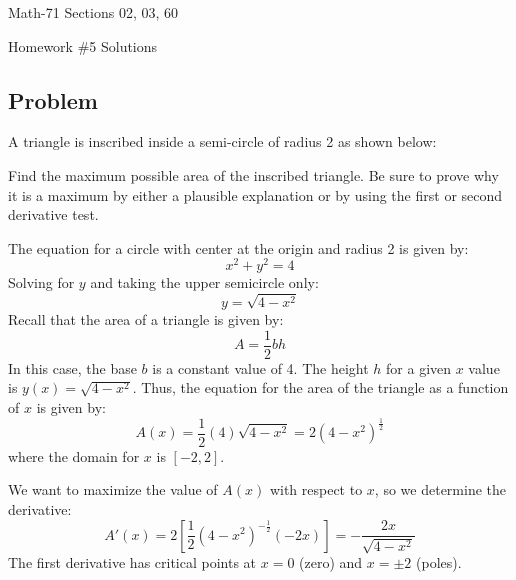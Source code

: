 \documentclass[letterpaper,12pt,fleqn]{article}
\begin{document}
\begin{center}
  \large
  Math-71 Sections 02, 03, 60

  \Large
  Homework \#5 Solutions
\end{center}

\subsection*{Problem}

A triangle is inscribed inside a semi-circle of radius 2 as shown below:

\bigskip

\begin{center}
\end{center}

\bigskip

Find the maximum possible area of the inscribed triangle.  Be sure to prove why it is a maximum by either a plausible
explanation or by using the first or second derivative test.

The equation for a circle with center at the origin and radius 2 is given by:
\[x^2+y^2=4\]
Solving for \(y\) and taking the upper semicircle only:
\[y=\sqrt{4-x^2}\]
Recall that the area of a triangle is given by:
\[A=\frac{1}{2}bh\]
In this case, the base \(b\) is a constant value of 4.  The height \(h\) for a given \(x\) value is
\(y(x)=\sqrt{4-x^2}\).  Thus, the equation for the area of the triangle as a function of \(x\) is given by:
\[A(x)=\frac{1}{2}(4)\sqrt{4-x^2}=2(4-x^2)^{\frac{1}{2}}\]
where the domain for \(x\) is \([-2,2]\).

We want to maximize the value of \(A(x)\) with respect to \(x\), so we determine the derivative:
\[A'(x)=2\left[\frac{1}{2}(4-x^2)^{-\frac{1}{2}}(-2x)\right]=-\frac{2x}{\sqrt{4-x^2}}\]
The first derivative has critical points at \(x=0\) (zero) and \(x=\pm2\) (poles).
\end{document}
